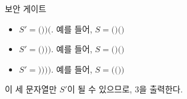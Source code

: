 \begin{problem}{보안 게이트}
	\begin{itemize}
		\item $S' = \texttt{())(}$. 예를 들어, $S = \texttt{()()}$
		\item $S' = \texttt{()))}$. 예를 들어, $S = \texttt{()()}$
		\item $S' = \texttt{))))}$. 예를 들어, $S = \texttt{(())}$
	\end{itemize}
	
	이 세 문자열만 $S'$이 될 수 있으므로, 3을 출력한다.
	
	
	\begin{example}
\end{example}


\end{problem}
